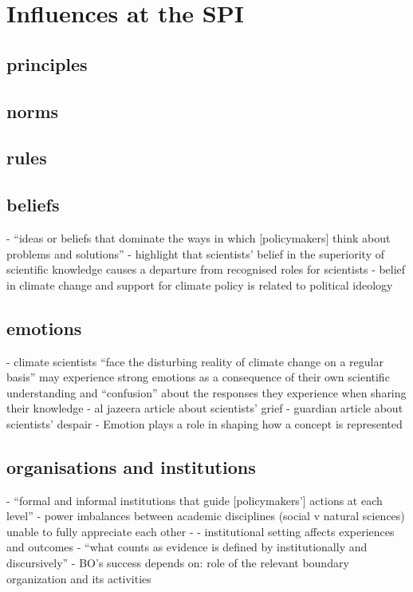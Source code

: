 \section{Influences at the SPI}

\subsection{principles}

\subsection{norms}

\subsection{rules}

\subsection{beliefs}
\cite{CairneyW2017} - ``ideas or beliefs that dominate the ways in which [policymakers] think about problems and solutions''
\cite{BalvaneraJNOBCDGGKKMPSSW2020} - highlight that scientists' belief in the superiority of scientific knowledge causes a departure from recognised roles for scientists
\cite{BerkebileWeinbergGDVV2024} - belief in climate change and support for climate policy is related to political ideology

\subsection{emotions}
\cite{RandallH2019} - climate scientists ``face the disturbing reality of climate change on a regular basis'' may experience strong emotions as a consequence of their own scientific understanding and ``confusion'' about the responses they experience when sharing their knowledge
\cite{Pivovarchuk2024} - al jazeera article about scientists' grief
\cite{Carrington2024} - guardian article about scientists' despair
\cite{Makin2024} - Emotion plays a role in shaping how a concept is represented

\subsection{organisations and institutions}
\cite{CairneyW2017} - ``formal and informal institutions that guide [policymakers'] actions at each level''
\cite{BalvaneraJNOBCDGGKKMPSSW2020} - power imbalances between academic disciplines (social v natural sciences) unable to fully appreciate each other
\cite{GeuijenMCRv2017} - 
\cite{SaxonbergSL2023} - institutional setting affects experiences and outcomes
\cite{StrassheimK2014} - ``what counts as evidence is defined by institutionally and discursively''
\cite{WesselinkH2020} - BO's success depends on: role of the relevant boundary organization and its activities

